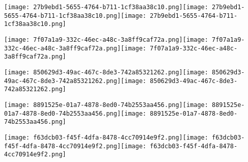 \documentclass[12pt]{article}
\begin{document}
\begin{labels}
        \hfill\texttt{[image: 27b9ebd1-5655-4764-b711-1cf38aa38c10.png]}\hfill\texttt{[image: 27b9ebd1-5655-4764-b711-1cf38aa38c10.png]}\hfill\texttt{[image: 27b9ebd1-5655-4764-b711-1cf38aa38c10.png]}\hfill\\

        \hfill\texttt{[image: 7f07a1a9-332c-46ec-a48c-3a8ff9caf72a.png]}\hfill\texttt{[image: 7f07a1a9-332c-46ec-a48c-3a8ff9caf72a.png]}\hfill\texttt{[image: 7f07a1a9-332c-46ec-a48c-3a8ff9caf72a.png]}\hfill\\

        \hfill\texttt{[image: 850629d3-49ac-467c-8de3-742a85321262.png]}\hfill\texttt{[image: 850629d3-49ac-467c-8de3-742a85321262.png]}\hfill\texttt{[image: 850629d3-49ac-467c-8de3-742a85321262.png]}\hfill\\

        \hfill\texttt{[image: 8891525e-01a7-4878-8ed0-74b2553aa456.png]}\hfill\texttt{[image: 8891525e-01a7-4878-8ed0-74b2553aa456.png]}\hfill\texttt{[image: 8891525e-01a7-4878-8ed0-74b2553aa456.png]}\hfill\\

        \hfill\texttt{[image: f63dcb03-f45f-4dfa-8478-4cc70914e9f2.png]}\hfill\texttt{[image: f63dcb03-f45f-4dfa-8478-4cc70914e9f2.png]}\hfill\texttt{[image: f63dcb03-f45f-4dfa-8478-4cc70914e9f2.png]}\hfill\\

\end{labels}
\end{document}
